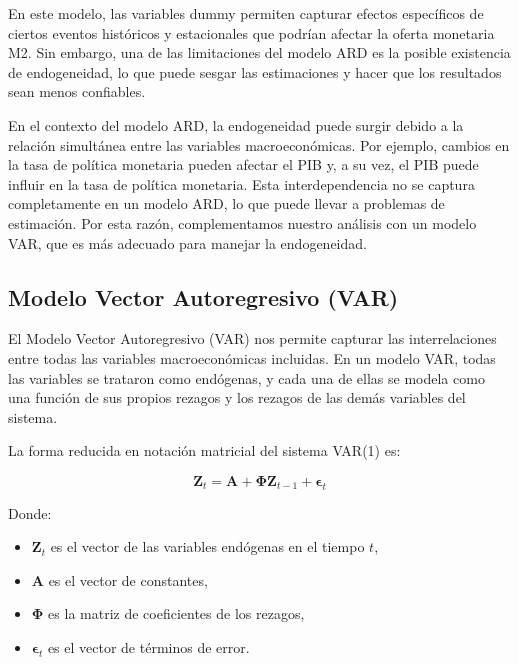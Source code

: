 \documentclass[
  12pt,
]{article}
\providecommand{\tightlist}{%
  \setlength{\itemsep}{0pt}\setlength{\parskip}{0pt}}
\begin{document}
En este modelo, las variables dummy permiten capturar efectos
específicos de ciertos eventos históricos y estacionales que podrían
afectar la oferta monetaria M2. Sin embargo, una de las limitaciones del
modelo ARD es la posible existencia de endogeneidad, lo que puede sesgar
las estimaciones y hacer que los resultados sean menos confiables.

En el contexto del modelo ARD, la endogeneidad puede surgir debido a la
relación simultánea entre las variables macroeconómicas. Por ejemplo,
cambios en la tasa de política monetaria pueden afectar el PIB y, a su
vez, el PIB puede influir en la tasa de política monetaria. Esta
interdependencia no se captura completamente en un modelo ARD, lo que
puede llevar a problemas de estimación. Por esta razón, complementamos
nuestro análisis con un modelo VAR, que es más adecuado para manejar la
endogeneidad.

\subsection{Modelo Vector Autoregresivo
(VAR)}\label{modelo-vector-autoregresivo-var}

El Modelo Vector Autoregresivo (VAR) nos permite capturar las
interrelaciones entre todas las variables macroeconómicas incluidas. En
un modelo VAR, todas las variables se trataron como endógenas, y cada
una de ellas se modela como una función de sus propios rezagos y los
rezagos de las demás variables del sistema.

La forma reducida en notación matricial del sistema VAR(1) es:

\[\mathbf{Z}_t = \mathbf{A} + \mathbf{\Phi} \mathbf{Z}_{t-1} + \mathbf{\epsilon}_t\]

Donde:

\begin{itemize}
\tightlist
\item
  \(\mathbf{Z}_t\) es el vector de las variables endógenas en el tiempo
  \(t\),
\item
  \(\mathbf{A}\) es el vector de constantes,
\item
  \(\mathbf{\Phi}\) es la matriz de coeficientes de los rezagos,
\item
  \(\mathbf{\epsilon}_t\) es el vector de términos de error.
\end{itemize}
\end{document}
